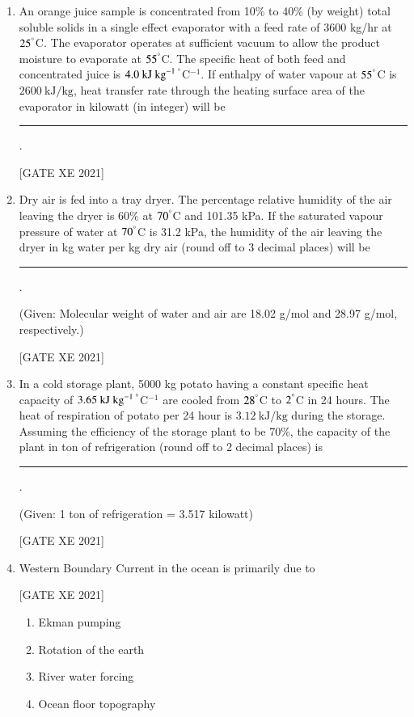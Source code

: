 \documentclass[journal,12pt,onecolumn]{IEEEtran}
\theoremstyle{remark}
\begin{document}
\begin{enumerate}[resume]
\item An orange juice sample is concentrated from 10\% to 40\% (by weight) total soluble solids in a single effect evaporator with a feed rate of 3600 kg/hr at $25^\degree$C. The evaporator operates at sufficient vacuum to allow the product moisture to evaporate at $55^\degree$C. The specific heat of both feed and concentrated juice is $4.0\ \text{kJ kg}^{-1}\,^\degree$C$^{-1}$. If enthalpy of water vapour at $55^\degree$C is $2600\ \text{kJ/kg}$, heat transfer rate through the heating surface area of the evaporator in kilowatt (in integer) will be \rule{3cm}{0.15mm}.

\hfill[GATE XE 2021]


\item Dry air is fed into a tray dryer. The percentage relative humidity of the air leaving the dryer is 60\% at $70^\degree$C and 101.35 kPa. If the saturated vapour pressure of water at $70^\degree$C is 31.2 kPa, the humidity of the air leaving the dryer in kg water per kg dry air (round off to 3 decimal places) will be \rule{3cm}{0.15mm}.  

(Given: Molecular weight of water and air are 18.02 g/mol and 28.97 g/mol, respectively.)

\hfill[GATE XE 2021]


\item In a cold storage plant, 5000 kg potato having a constant specific heat capacity of $3.65\ \text{kJ kg}^{-1}\,^\degree$C$^{-1}$ are cooled from $28^\degree$C to $2^\degree$C in 24 hours. The heat of respiration of potato per 24 hour is $3.12\ \text{kJ/kg}$ during the storage. Assuming the efficiency of the storage plant to be 70\%, the capacity of the plant in ton of refrigeration (round off to 2 decimal places) is \rule{3cm}{0.15mm}.  

(Given: 1 ton of refrigeration = 3.517 kilowatt)

\hfill[GATE XE 2021]

\item Western Boundary Current in the ocean is primarily due to

\hfill[GATE XE 2021]

\begin{multicols}{2}
\begin{enumerate}
\item Ekman pumping
\item Rotation of the earth
\item River water forcing
\item Ocean floor topography
\end{enumerate}
\end{multicols}



\end{enumerate}
\end{document}
